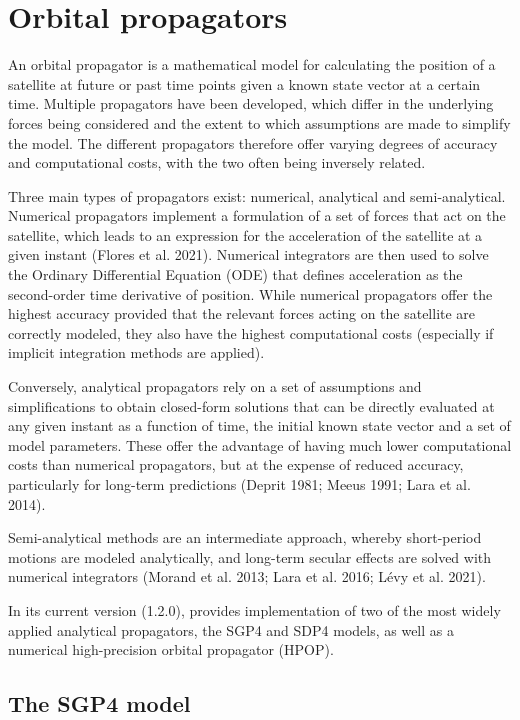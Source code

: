 \hypertarget{orbital-propagators}{%
\section{Orbital propagators}\label{orbital-propagators}}

An orbital propagator is a mathematical model for calculating the position of a satellite at future or past time points given a known state vector at a certain time. Multiple propagators have been developed, which differ in the underlying forces being considered and the extent to which assumptions are made to simplify the model. The different propagators therefore offer varying degrees of accuracy and computational costs, with the two often being inversely related.

Three main types of propagators exist: numerical, analytical and semi-analytical. Numerical propagators implement a formulation of a set of forces that act on the satellite, which leads to an expression for the acceleration of the satellite at a given instant (Flores et al. 2021). Numerical integrators are then used to solve the Ordinary Differential Equation (ODE) that defines acceleration as the second-order time derivative of position. While numerical propagators offer the highest accuracy provided that the relevant forces acting on the satellite are correctly modeled, they also have the highest computational costs (especially if implicit integration methods are applied).

Conversely, analytical propagators rely on a set of assumptions and simplifications to obtain closed-form solutions that can be directly evaluated at any given instant as a function of time, the initial known state vector and a set of model parameters. These offer the advantage of having much lower computational costs than numerical propagators, but at the expense of reduced accuracy, particularly for long-term predictions (Deprit 1981; Meeus 1991; Lara et al. 2014).

Semi-analytical methods are an intermediate approach, whereby short-period motions are modeled analytically, and long-term secular effects are solved with numerical integrators (Morand et al. 2013; Lara et al. 2016; Lévy et al. 2021).

In its current version (1.2.0),  provides implementation of two of the most widely applied analytical propagators, the SGP4 and SDP4 models, as well as a numerical high-precision orbital propagator (HPOP).

\hypertarget{the-sgp4-model}{%
\subsection{The SGP4 model}\label{the-sgp4-model}}

